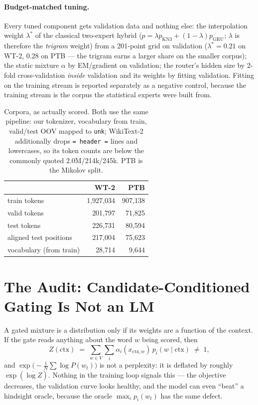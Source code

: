 \documentclass[11pt]{article}
\begin{document}
\paragraph{Budget-matched tuning.} Every tuned component gets validation data
and nothing else: the interpolation weight $\lambda^{*}$ of the classical
two-expert hybrid ($p = \lambda p_{\mathrm{KN3}} + (1-\lambda)
p_{\mathrm{GRU}}$; $\lambda$ is therefore the \emph{trigram} weight) from a
201-point grid on validation ($\lambda^{*}=0.21$ on WT-2, $0.28$ on PTB ---
the trigram earns a larger share on the smaller corpus); the static mixture $\alpha$ by EM/gradient on validation; the
router's hidden size by 2-fold cross-validation \emph{inside} validation and
its weights by fitting validation. Fitting on the training stream is reported
separately as a negative control, because the training stream is the corpus the
statistical experts were built from.

\begin{table}[t]
\centering\small
\begin{tabular}{lrr}
\toprule
 & WT-2 & PTB \\
\midrule
train tokens & 1{,}927{,}034 & 907{,}138 \\
valid tokens & 201{,}797 & 71{,}825 \\
test tokens & 226{,}731 & 80{,}594 \\
aligned test positions & 217{,}004 & 75{,}623 \\
vocabulary (from train) & 28{,}714 & 9{,}644 \\
\bottomrule
\end{tabular}
\caption{Corpora, as actually scored. Both use the same pipeline: our
tokenizer, vocabulary from train, valid/test OOV mapped to \texttt{unk};
WikiText-2 additionally drops \texttt{= header =} lines and lowercases, so its
token counts are below the commonly quoted 2.0M/214k/245k. PTB is the Mikolov
split.}
\label{tab:corpora}
\end{table}

\section{The Audit: Candidate-Conditioned Gating Is Not an LM}
\label{sec:audit}

A gated mixture is a distribution only if its weights are a function of the
context. If the gate reads anything about the word $w$ being scored, then
\begin{equation}
Z(\mathrm{ctx}) \;=\; \sum_{w \in V} \sum_i \alpha_i(x_{\mathrm{ctx},w})\,
p_i(w\mid\mathrm{ctx}) \;\neq\; 1,
\end{equation}
and $\exp\bigl(-\tfrac1N\sum \log P(w_t)\bigr)$ is not a perplexity: it is
deflated by roughly $\exp(\overline{\log Z})$. Nothing in the training loop
signals this --- the objective decreases, the validation curve looks healthy,
and the model can even ``beat'' a hindsight oracle, because the oracle
$\max_i p_i(w_t)$ has the same defect.
\end{document}
